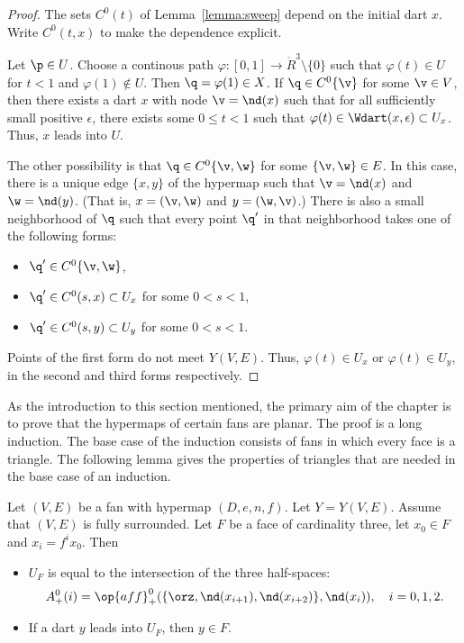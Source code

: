 \begin{proof}  
The sets $C^0(t)$ of Lemma~\ref{lemma:sweep} depend on the initial dart $x$.
Write $C^0(t,x)$ to make the dependence explicit.

Let $\p\in U$.  Choose a continous path $\varphi:[0,1]\to
\ring{R}^3\setminus\{0\}$ such that $\varphi(t)\in U$ for $t<1$ and
$\varphi(1)\not\in U$.  Then $\q=\varphi(1)\in X$.  If $\q\in
C^0\{\v\}$ for some $\v\in V$, then there exists a dart $x$ with
node $\v = \nd(x)$ such that for all sufficiently small positive
$\epsilon$, there exists some $0\le t < 1$ such that $\varphi(t)\in
\Wdart(x,\epsilon)\subset U_x$.  Thus, $x$ leads into $U$.
%

The other possibility is that $\q\in C^0\{\v,\w\}$ for some
$\{\v,\w\}\in E$.  In this case, there is a unique edge $\{x,y\}$ of
the hypermap such that $\v=\nd(x)$ and $\w=\nd(y)$.  (That is,
$x=(\v,\w)$ and $y=(\w,\v)$.)  There is also a small neighborhood of
$\q$ such that every point $\q'$ in that neighborhood takes one of
the following forms:
\begin{itemize} \item $\q'\in C^0\{\v,\w\}$,
\item $\q'\in C^0(s,x)\subset U_x$ for some $0<s<1$,
\item $\q'\in C^0(s,y)\subset U_y$ for some $0<s<1$.
\end{itemize}
Points of the first form do not meet $Y(V,E)$.  Thus, $\varphi(t)\in U_x$
or $\varphi(t)\in U_y$, in the second and third forms respectively.
\end{proof}

As the introduction to this section mentioned, the primary aim of the chapter
is to prove that the hypermaps of certain fans are planar.  The proof is a long
induction.  The base case of the induction consists of fans in which every face
is a triangle.  The following lemma gives the properties of triangles that are
needed in the base case of an induction.

\begin{lemma} \label{lemma:triangle}
Let $(V,E)$ be a fan with hypermap $(D,e,n,f)$.  Let $Y=Y(V,E)$.
Assume that $(V,E)$ is fully surrounded. Let  $F$ be a face of
cardinality three, let $x_0\in F$ and  $x_i = f^i x_0$. Then
%
\begin{itemize}  
\item $U_F$ is equal to the intersection of the three half-spaces:
\begin{displaymath}A^0_+(i)=\op{aff}_+^0(\{\orz,\nd(x_{i+1}),\nd(x_{i+2})\},\nd(x_i)),\quad
i=0,1,2.\end{displaymath}
\item If a dart $y$ leads into $U_F$, then $y\in F$.
\end{itemize}
\end{lemma}
%

